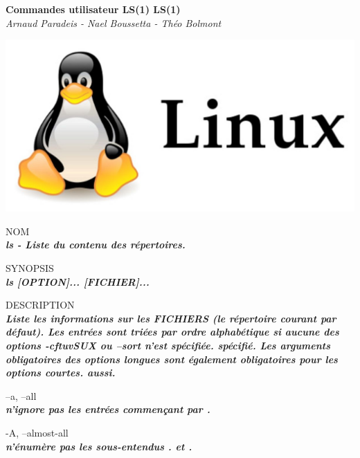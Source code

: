 \documentclass{article}
\begin{document}
\begin{center}
\huge  \textbf{Commandes utilisateur LS(1) LS(1)} \\

\normalsize \textit {Arnaud Paradeis - Nael Boussetta - Théo Bolmont}\\[4cm]
\end{center}
\includegraphics{image/linux.jpg}










\par NOM\\
		\textit{\textbf{ls - Liste du contenu des répertoires.}}\\
\par SYNOPSIS\\
		\textit{\textbf{ls [OPTION]... [FICHIER]...}}\\
\par DESCRIPTION\\
		\textit{\textbf{Liste les informations sur les FICHIERS (le répertoire courant par défaut).
       Les entrées sont triées par ordre alphabétique si aucune des options -cftuvSUX ou --sort n'est spécifiée.
       spécifié. Les arguments obligatoires des options longues sont également obligatoires pour les options courtes.
       aussi.}}\\

\par --a, --all\\
		\textit{\textbf{n'ignore pas les entrées commençant par .}}\\

\par -A, --almost-all\\
		\textit{\textbf{n'énumère pas les sous-entendus . et .}}\\
\end{document}
